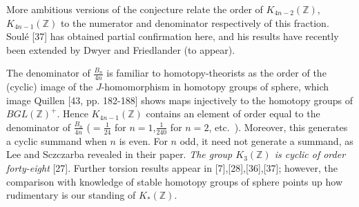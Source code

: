 More ambitious versions of the conjecture relate the order of $K_{4n-2}(\mathbb{Z})$, $K_{4n-1}(\mathbb{Z})$ to the numerator and denominator respectively of this fraction. Soul\'{e} [37] has obtained partial confirmation here, and his results have recently been extended by Dwyer and Friedlander (to appear).

The denominator of $\frac{B_n}{4n}$ is familiar to homotopy-theorists as the order of the (cyclic) image of the $J$-homomorphism in homotopy groups of sphere, which image Quillen [43, pp. 182-188] shows maps injectively to the homotopy groups of $BGL(\mathbb{Z})^+$. Hence $K_{4n-1}(\mathbb{Z})$ contains an element of order equal to the denominator of $\frac{B_n}{4n}$ ($=\frac{1}{24}$ for $n=1$,$\frac{1}{240}$ for $n=2$, etc.\ ). Moreover, this generates a cyclic summand when $n$ is even. For $n$ odd, it need not generate a summand, as Lee and Sczczarba revealed in their paper. {\em The group $K_3(\mathbb{Z})$ is cyclic of order forty-eight} [27]. Further torsion results appear in [7],[28],[36],[37]; however, the comparison with knowledge of stable homotopy groups of sphere points up how rudimentary is our standing of $K_*(\mathbb{Z})$.


